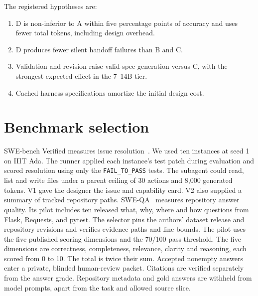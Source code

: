 \documentclass[sigconf,nonacm]{acmart}
\begin{document}
The registered hypotheses are:
\begin{enumerate}
\item[H1.] D is non-inferior to A within five percentage points of accuracy
and uses fewer total tokens, including design overhead.
\item[H2.] D produces fewer silent handoff failures than B and C.
\item[H3.] Validation and revision raise valid-spec generation versus C,
with the strongest expected effect in the 7--14B tier.
\item[H4.] Cached harness specifications amortize the initial design cost.
\end{enumerate}

\section{Benchmark selection}
SWE-bench Verified measures issue resolution~\cite{swebench}. We used
ten instances at seed 1 on IIIT Ada. The runner applied each instance's
test patch during evaluation and scored resolution using only the
\texttt{FAIL\_TO\_PASS} tests. The subagent could read, list and write files
under a parent ceiling of 30 actions and 8,000 generated tokens. V1 gave
the designer the issue and capability card. V2 also supplied a summary
of tracked repository paths. SWE-QA~\cite{peng} measures repository answer
quality. Its pilot includes ten released what, why, where and how questions
from Flask, Requests, and pytest. The selector pins the authors' dataset release
and repository revisions and verifies evidence paths and line bounds.
The pilot uses the five published scoring dimensions and the 70/100 pass
threshold. The five dimensions are correctness, completeness, relevance, clarity and
reasoning, each scored from 0 to 10. The total is twice their sum.
Accepted nonempty answers enter a private, blinded human-review packet. Citations are verified
separately from the answer grade. Repository metadata and gold answers are
withheld from model prompts, apart from the task and allowed source slice.
\end{document}
